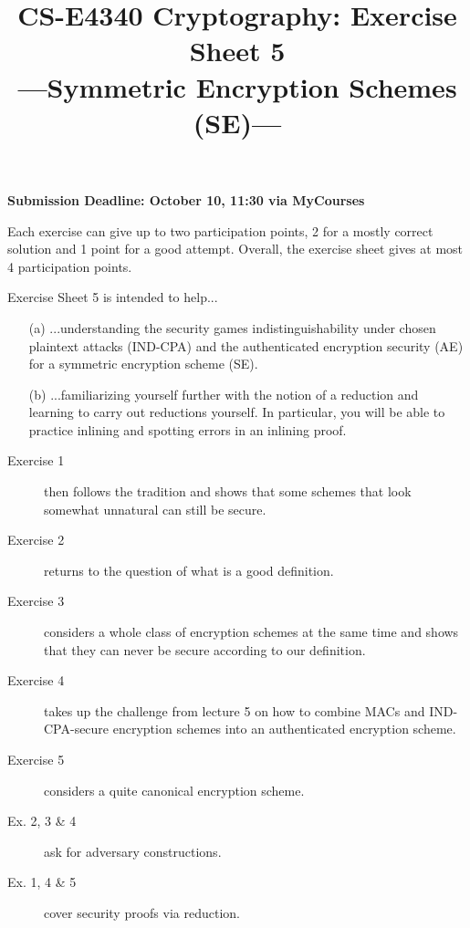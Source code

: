 \documentclass[envcountsame,runningheads,notitlepage]{../llncs}
\title{CS-E4340 Cryptography: Exercise Sheet 5\\[0.5\baselineskip]
\large ---Symmetric Encryption Schemes (SE)---}
\author{}\institute{}
\theoremstyle{definition}
\begin{document}
\maketitle

\noindent
\textbf{Submission Deadline: October 10, 11:30 via MyCourses}

\medskip
\noindent
Each exercise can give up to two participation points, 2 for a mostly correct solution and 1 point for a good attempt. Overall, the exercise sheet gives at most 4 participation points.



\medskip
\noindent
Exercise Sheet 5 is intended to help...
\begin{itemize}
\item[(a)] ...understanding the security games indistinguishability under chosen plaintext attacks (IND-CPA) and the authenticated encryption security (AE) for a symmetric encryption scheme (SE).
\item[(b)] ...familiarizing yourself further with the notion of a reduction and learning to carry out reductions yourself. In particular, you will be able to practice inlining and spotting errors in an inlining proof.
\end{itemize}

\begin{description}
\item[Exercise 1] then follows the tradition and shows that some schemes that look somewhat unnatural can still be secure.
\item[Exercise 2] returns to the question of what is a good definition.
\item[Exercise 3] considers a whole class of encryption schemes at the same time and shows that they can never be secure according to our definition.
\item[Exercise 4] takes up the challenge from lecture 5 on how to combine MACs and IND-CPA-secure encryption schemes into an authenticated encryption scheme.
\item[Exercise 5] considers a quite canonical encryption scheme.
\item[Ex. 2, 3 \& 4] ask for adversary constructions.
\item[Ex. 1, 4 \& 5] cover security proofs via reduction.
\end{description}
\end{document}
